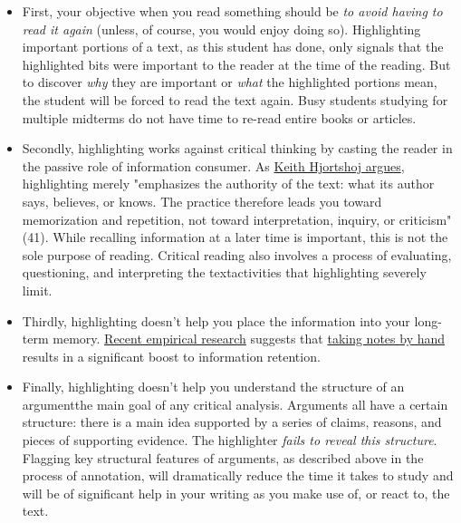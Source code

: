 \begin{itemize}

\item First, your objective when you read something should be \emph{to avoid having to read it again} (unless, of course, you would enjoy doing so). Highlighting important portions of a text, as this student has done, only signals that the highlighted bits were important to the reader at the time of the reading. But to discover \emph{why} they are important or \emph{what} the highlighted portions mean, the student will be forced to read the text again. Busy students studying for multiple midterms do not have time to re-read entire books or articles.  

\item Secondly, highlighting works against critical thinking by casting the reader in the passive role of information consumer. As \href{http://libcat.dartmouth.edu/record=6773185}{Keith Hjortshoj argues}, highlighting merely "emphasizes the authority of the text: what its author says, believes, or knows. The practice therefore leads you toward memorization and repetition, not toward interpretation, inquiry, or criticism" (41). While recalling information at a later time is important, this is not the sole purpose of reading. Critical reading also involves a process of evaluating, questioning, and interpreting the text\textemdash activities that highlighting severely limit.

\item Thirdly, highlighting doesn't help you place the information into your long-term memory. \href{https://sites.udel.edu/victorp/files/2010/11/Psychological-Science-2014-Mueller-0956797614524581-1u0h0yu.pdf}{Recent empirical 
research} suggests that \href{https://www.scientificamerican.com/article/a-learning-secret-don-t-take-notes-with-a-laptop/}{taking notes by hand} results in a significant boost to information retention.

\item Finally, highlighting doesn't help you understand the structure of an argument\textemdash the main goal of any critical analysis. Arguments all have a certain structure: there is a main idea supported by a series of claims, reasons, and pieces of supporting evidence. The highlighter \emph{fails to reveal this structure}. Flagging key structural features of arguments, as described above in the process of annotation, will dramatically reduce the time it takes to study and will be of significant help in your writing as you make use of, or react to, the text.

\end{itemize}


